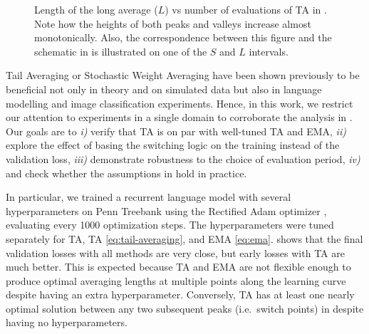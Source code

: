 \documentclass[twocolumn]{article}
\newcommand{\tta}{\textlf{2}TA}
\begin{document}
\begin{figure}[t]
  \centering
  \caption[Length of the long average ($L$) vs number of evaluations of \tta{}.]{Length of the long average ($L$) vs number of evaluations of \tta{} in .
Note how the heights of both peaks and valleys increase almost monotonically.
Also, the correspondence between this figure and the schematic in  is illustrated on one of the $S$ and $L$ intervals.}
  \label{fig:length}
\end{figure}

Tail Averaging or Stochastic Weight Averaging have been shown previously to be beneficial not only in theory and on simulated data \citep{jain2018parallelizing} but also in language modelling \citep{merity2017regularizing,melis2019mogrifier} and image classification \citep{izmailov2018averaging} experiments.
Hence, in this work, we restrict our attention to experiments in a single domain to corroborate the analysis in .
Our goals are to \emph{i)} verify that \tta{} is on par with well-tuned TA and EMA, \emph{ii)} explore the effect of basing the switching logic on the training instead of the validation loss, \emph{iii)} demonstrate robustness to the choice of evaluation period, \emph{iv)} and check whether the assumptions in  hold in practice.

In particular, we trained a recurrent language model with several hyperparameters on Penn Treebank \citep{mikolov2010recurrent} using the Rectified Adam optimizer \citep{liu2019variance}, evaluating every 1000 optimization steps.
The hyperparameters were tuned separately for \tta{}, TA \cref{eq:tail-averaging}, and EMA \cref{eq:ema}.
 shows that the final validation losses with all methods are very close, but early losses with \tta{} are much better.
This is expected because TA and EMA are not flexible enough to produce optimal averaging lengths at multiple points along the learning curve despite having an extra hyperparameter.
Conversely, \tta{} has at least one nearly optimal solution between any two subsequent peaks (i.e.\ switch points) in  despite having no hyperparameters.
\end{document}
